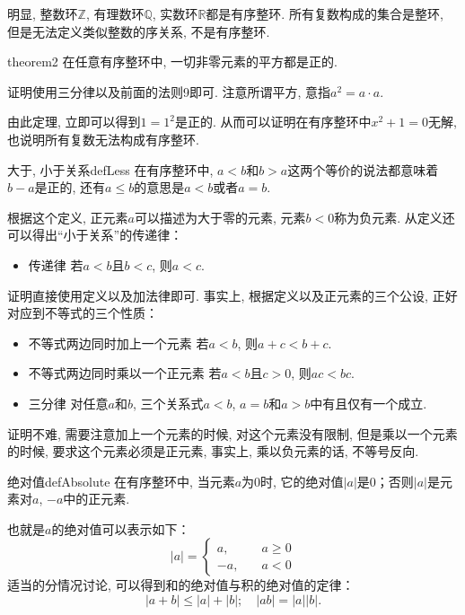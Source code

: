 明显, 整数环$\mathbb{Z}$, 有理数环$\mathbb{Q}$, 实数环$\mathbb{R}$都是有序整环. 所有复数构成的集合是整环, 但是无法定义类似整数的序关系, 不是有序整环. 

\begin{theorem}{}{theorem2}
在任意有序整环中, 一切非零元素的平方都是正的. 
\end{theorem}

证明使用三分律以及前面的法则9即可. 注意所谓平方, 意指$a^2 = a \cdot a$. 

由此定理, 立即可以得到$1=1^2$是正的. 从而可以证明在有序整环中$x^2+1=0$无解, 也说明所有复数无法构成有序整环. 

\begin{definition}{大于, 小于关系}{defLess}
在有序整环中, $a<b$和$b>a$这两个等价的说法都意味着$b-a$是正的, 还有$a \le b$的意思是$a<b$或者$a=b$. 
\end{definition}
根据这个定义, 正元素$a$可以描述为大于零的元素, 元素$b<0$称为负元素. 从定义还可以得出“小于关系”的传递律：
\begin{itemize}
\item 传递律 若$a < b$且$b<c$, 则$a<c$. 
\end{itemize}

证明直接使用定义以及加法律即可. 事实上, 根据定义以及正元素的三个公设, 正好对应到不等式的三个性质：
\begin{itemize}
\item 不等式两边同时加上一个元素 若$a < b$, 则$a+c < b+c$. 
\item 不等式两边同时乘以一个正元素 若$a < b$且$c > 0$, 则$ac < bc$. 
\item 三分律 对任意$a$和$b$, 三个关系式$a<b$, $a=b$和$a>b$中有且仅有一个成立. 
\end{itemize}

证明不难, 需要注意加上一个元素的时候, 对这个元素没有限制, 但是乘以一个元素的时候, 要求这个元素必须是正元素, 事实上, 乘以负元素的话, 不等号反向. 

\begin{definition}{绝对值}{defAbsolute}
在有序整环中, 当元素$a$为0时, 它的绝对值$|a|$是0；否则$|a|$是元素对$a$, $-a$中的正元素. 
\end{definition}
也就是$a$的绝对值可以表示如下： 
\[
|a| = \left\{
\begin{aligned}
a, &\quad a \ge 0 \\
-a, &\quad a < 0
\end{aligned}
\right.
\]
适当的分情况讨论, 可以得到和的绝对值与积的绝对值的定律： 
\begin{equation}\label{equ001010303}
|a+b| \le |a| + |b|; \quad |ab|=|a||b|.
\end{equation}

